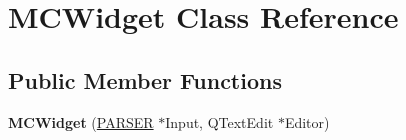 \hypertarget{classMCWidget}{
\section{MCWidget Class Reference}
\label{classMCWidget}
}
\subsection*{Public Member Functions}
\begin{DoxyCompactItemize}
\item 
\hypertarget{classMCWidget_aa7df43b4e667429b75d836397c4bb02a}{
{\bfseries MCWidget} (\hyperlink{classPARSER}{PARSER} $\ast$Input, QTextEdit $\ast$Editor)}
\label{classMCWidget_aa7df43b4e667429b75d836397c4bb02a}

\end{DoxyCompactItemize}
